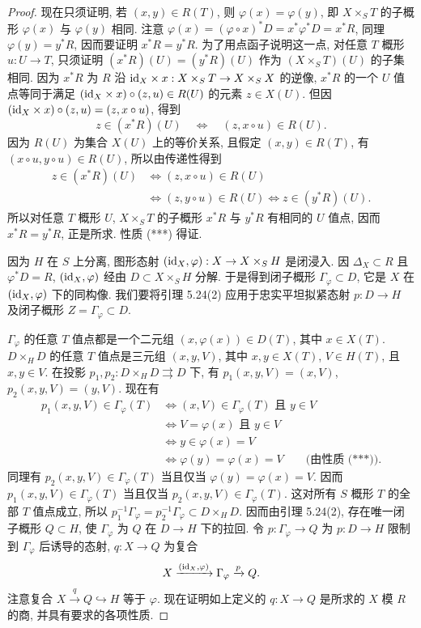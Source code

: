 \begin{proof}
现在只须证明, 若 $(x,y)\in R(T)$, 则 $\varphi(x)=\varphi(y)$, 即 $X\times_S T$ 的子概形 $\varphi(x)$ 与 $\varphi(y)$ 相同. 注意 $\varphi(x)=(\varphi\circ x)^*D=x^*\varphi^*D=x^*R$, 同理 $\varphi(y)=y^*R$, 因而要证明 $x^*R=y^*R$. 为了用点函子说明这一点, 对任意 $T$ 概形 $u:U\to T$, 只须证明 $(x^*R)(U)=(y^*R)(U)$ 作为 $(X\times_S T)(U)$ 的子集相同. 因为 $x^*R$ 为 $R$ 沿 $\mathrm{id}_X\times x:X\times_S T\to X\times_S X$ 的逆像, $x^*R$ 的一个 $U$ 值点等同于满足 $(\mathrm{id}_X\times x)\circ(z,u)\in R(U)$ 的元素 $z\in X(U)$. 但因 $(\mathrm{id}_X\times x)\circ(z,u)=(z,x\circ u)$, 得到
\[
 z\in(x^*R)(U)\quad\Longleftrightarrow\quad(z,x\circ u)\in R(U).
\]
因为 $R(U)$ 为集合 $X(U)$ 上的等价关系, 且假定 $(x,y)\in R(T)$, 有 $(x\circ u,y\circ u)\in R(U)$, 所以由传递性得到
\[
\begin{aligned}
 z\in(x^*R)(U)&\Longleftrightarrow(z,x\circ u)\in R(U)\\
 &\Longleftrightarrow(z,y\circ u)\in R(U)
 \Longleftrightarrow z\in(y^*R)(U).
\end{aligned}
\]
所以对任意 $T$ 概形 $U$, $X\times_S T$ 的子概形 $x^*R$ 与 $y^*R$ 有相同的 $U$ 值点, 因而 $x^*R=y^*R$, 正是所求. 性质 (***) 得证.

因为 $H$ 在 $S$ 上分离, 图形态射 $(\mathrm{id}_X,\varphi):X\to X\times_S H$ 是闭浸入. 因 $\Delta_X\subset R$ 且 $\varphi^*D=R$, $(\mathrm{id}_X,\varphi)$ 经由 $D\subset X\times_S H$ 分解. 于是得到闭子概形 $\Gamma_\varphi\subset D$, 它是 $X$ 在 $(\mathrm{id}_X,\varphi)$ 下的同构像. 我们要将引理 5.24(2) 应用于忠实平坦拟紧态射 $p:D\to H$ 及闭子概形 $Z=\Gamma_\varphi\subset D$.

$\Gamma_\varphi$ 的任意 $T$ 值点都是一个二元组 $(x,\varphi(x))\in D(T)$, 其中 $x\in X(T)$. $D\times_H D$ 的任意 $T$ 值点是三元组 $(x,y,V)$, 其中 $x,y\in X(T)$, $V\in H(T)$, 且 $x,y\in V$. 在投影 $p_1,p_2:D\times_H D\rightrightarrows D$ 下, 有 $p_1(x,y,V)=(x,V)$, $p_2(x,y,V)=(y,V)$. 现在有
\[
\begin{aligned}
 p_1(x,y,V)\in\Gamma_\varphi(T)
 &\Longleftrightarrow (x,V)\in\Gamma_\varphi(T)\text{ 且 }y\in V\\
 &\Longleftrightarrow V=\varphi(x)\text{ 且 }y\in V\\
 &\Longleftrightarrow y\in\varphi(x)=V\\
 &\Longleftrightarrow\varphi(y)=\varphi(x)=V\qquad\text{(由性质 (***)).}
\end{aligned}
\]
同理有 $p_2(x,y,V)\in\Gamma_\varphi(T)$ 当且仅当 $\varphi(y)=\varphi(x)=V$. 因而 $p_1(x,y,V)\in\Gamma_\varphi(T)$ 当且仅当 $p_2(x,y,V)\in\Gamma_\varphi(T)$. 这对所有 $S$ 概形 $T$ 的全部 $T$ 值点成立, 所以 $p_1^{-1}\Gamma_\varphi=p_2^{-1}\Gamma_\varphi\subset D\times_H D$. 因而由引理 5.24(2), 存在唯一闭子概形 $Q\subset H$, 使 $\Gamma_\varphi$ 为 $Q$ 在 $D\to H$ 下的拉回. 令 $p:\Gamma_\varphi\to Q$ 为 $p:D\to H$ 限制到 $\Gamma_\varphi$ 后诱导的态射, $q:X\to Q$ 为复合
\[
 X\xrightarrow{(\mathrm{id}_X,\varphi)}\Gamma_\varphi\xrightarrow{p}Q.
\]
注意复合 $X\xrightarrow{q}Q\hookrightarrow H$ 等于 $\varphi$.
现在证明如上定义的 $q:X\to Q$ 是所求的 $X$ 模 $R$ 的商, 并具有要求的各项性质.


\end{proof}
